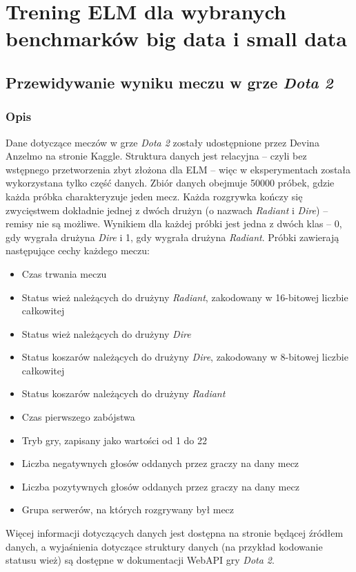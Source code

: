 \documentclass{article}
\begin{document}
\section{Trening ELM dla wybranych benchmarków big data i small data}
\subsection{Przewidywanie wyniku meczu w grze \textit{Dota 2}}
\subsubsection{Opis}
Dane dotyczące meczów w grze \textit{Dota 2} zostały udostępnione przez Devina Anzelmo na stronie Kaggle. Struktura danych jest relacyjna -- czyli bez wstępnego przetworzenia zbyt złożona dla ELM -- więc w eksperymentach została wykorzystana tylko część danych. Zbiór danych obejmuje 50000 próbek, gdzie każda próbka charakteryzuje jeden mecz. Każda rozgrywka kończy się zwycięstwem dokładnie jednej z dwóch drużyn (o nazwach \textit{Radiant} i \textit{Dire}) -- remisy nie są możliwe. Wynikiem dla każdej próbki jest jedna z dwóch klas -- 0, gdy wygrała drużyna \textit{Dire} i 1, gdy wygrała drużyna \textit{Radiant}. Próbki zawierają następujące cechy każdego meczu:
\begin{itemize}
\item Czas trwania meczu
\item Status wież należących do drużyny \textit{Radiant}, zakodowany w 16-bitowej liczbie całkowitej
\item Status wież należących do drużyny \textit{Dire}
\item Status koszarów należących do drużyny \textit{Dire}, zakodowany w 8-bitowej liczbie całkowitej
\item Status koszarów należących do drużyny \textit{Radiant}
\item Czas pierwszego zabójstwa
\item Tryb gry, zapisany jako wartości od 1 do 22
\item Liczba negatywnych głosów oddanych przez graczy na dany mecz 
\item Liczba pozytywnych głosów oddanych przez graczy na dany mecz
\item Grupa serwerów, na których rozgrywany był mecz
\end{itemize}
Więcej informacji dotyczących danych jest dostępna na stronie będącej źródłem danych, a wyjaśnienia dotyczące struktury danych (na przykład kodowanie statusu wież) są dostępne w dokumentacji WebAPI gry \textit{Dota 2}.
\end{document}
